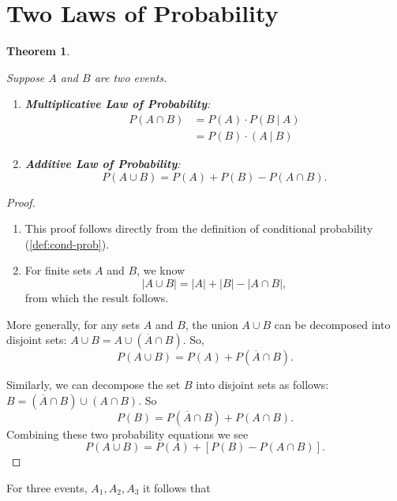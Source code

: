 \documentclass[
]{book}
\newtheorem{theorem}{Theorem}[chapter]
\theoremstyle{definition}
\theoremstyle{definition}
\theoremstyle{definition}
\theoremstyle{definition}
\theoremstyle{remark}
\begin{document}
\section{Two Laws of Probability}\label{two-laws-of-probability}

\begin{theorem}
\protect\hypertarget{thm:two-prob-laws}{}\label{thm:two-prob-laws}

Suppose \(A\) and \(B\) are two events.

\begin{enumerate}
\def\labelenumi{\arabic{enumi}.}
\item
  \textbf{Multiplicative Law of Probability}:
  \begin{align*}
    P(A \cap B) &= P(A)\cdot P(B~|~A) \\
             &= P(B) \cdot (A~|~B) 
    \end{align*}
\item
  \textbf{Additive Law of Probability}:
  \[P(A\cup B) = P(A) + P(B) - P(A \cap B).\]
\end{enumerate}

\end{theorem}

\begin{proof}
\leavevmode

\begin{enumerate}
\def\labelenumi{\arabic{enumi}.}
\item
  This proof follows directly from the definition of conditional probability (\ref{def:cond-prob}).
\item
  For finite sets \(A\) and \(B\), we know \[|A \cup B| = |A| + |B| - |A \cap B|,\] from which the result follows.
\end{enumerate}

More generally, for any sets \(A\) and \(B\), the union \(A \cup B\) can be decomposed into disjoint sets: \(A \cup B = A \cup (\overline{A} \cap B).\)
So, \[P(A \cup B) = P(A) + P(\overline{A} \cap B).\]

Similarly, we can decompose the set \(B\) into disjoint sets as follows: \(B = (\overline{A} \cap B) \cup (A \cap B).\)
So \[P(B) = P(\overline{A}\cap B) + P(A \cap B).\]
Combining these two probability equations we see \[P(A \cup B) = P(A) + \left[P(B)-P(A\cap B)\right].\]

\end{proof}

For three events, \(A_1, A_2, A_3\) it follows that
\end{document}
